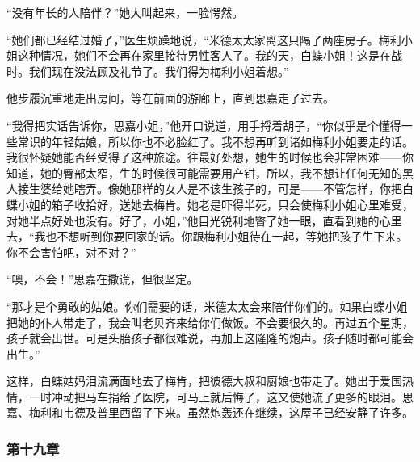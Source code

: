 \par “没有年长的人陪伴？”她大叫起来，一脸愕然。
\par “她们都已经结过婚了，”医生烦躁地说，“米德太太家离这只隔了两座房子。梅利小姐这种情况，她们不会再在家里接待男性客人了。我的天，白蝶小姐！这是在战时。我们现在没法顾及礼节了。我们得为梅利小姐着想。”
\par 他步履沉重地走出房间，等在前面的游廊上，直到思嘉走了过去。
\par “我得把实话告诉你，思嘉小姐，”他开口说道，用手捋着胡子，“你似乎是个懂得一些常识的年轻姑娘，所以你也不必脸红了。我不想再听到诸如梅利小姐要走的话。我很怀疑她能否经受得了这种旅途。往最好处想，她生的时候也会非常困难——你知道，她的臀部太窄，生的时候很可能需要用产钳，所以，我不想让任何无知的黑人接生婆给她瞎弄。像她那样的女人是不该生孩子的，可是——不管怎样，你把白蝶小姐的箱子收拾好，送她去梅肯。她老是吓得半死，只会使梅利小姐心里难受，对她半点好处也没有。好了，小姐，”他目光锐利地瞥了她一眼，直看到她的心里去，“我也不想听到你要回家的话。你跟梅利小姐待在一起，等她把孩子生下来。你不会害怕吧，对不对？”
\par “噢，不会！”思嘉在撒谎，但很坚定。
\par “那才是个勇敢的姑娘。你们需要的话，米德太太会来陪伴你们的。如果白蝶小姐把她的仆人带走了，我会叫老贝齐来给你们做饭。不会要很久的。再过五个星期，孩子就会出世。可是头胎孩子都很难说，再加上这隆隆的炮声。孩子随时都可能会出生。”
\par 这样，白蝶姑妈泪流满面地去了梅肯，把彼德大叔和厨娘也带走了。她出于爱国热情，一时冲动把马车捐给了医院，可马上就后悔了，这又使她流了更多的眼泪。思嘉、梅利和韦德及普里西留了下来。虽然炮轰还在继续，这屋子已经安静了许多。

\subsubsection{第十九章}

